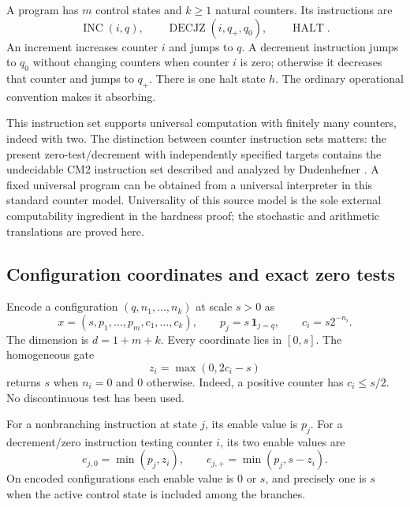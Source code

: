 \documentclass[11pt,letterpaper]{article}
\theoremstyle{definition}
\theoremstyle{remark}
\begin{document}
A program has $m$ control states and $k\geq1$ natural counters. Its
instructions are
\[
 \operatorname{INC}(i,q),\qquad
 \operatorname{DECJZ}(i,q_+,q_0),\qquad
 \operatorname{HALT}.
\]
An increment increases counter $i$ and jumps to $q$. A decrement instruction
jumps to $q_0$ without changing counters when counter $i$ is zero; otherwise
it decreases that counter and jumps to $q_+$. There is one halt state $h$.
The ordinary operational convention makes it absorbing.

This instruction set supports universal computation with finitely many
counters, indeed with two. The distinction between counter instruction
sets matters: the present zero-test/decrement with independently specified
targets contains the undecidable CM2 instruction set described and analyzed
by Dudenhefner \cite{dudenhefner}. A fixed universal program can be obtained
from a universal interpreter in this standard counter model. Universality
of this source model is the sole external computability ingredient in the
hardness proof; the stochastic and arithmetic translations are proved here.

\subsection{Configuration coordinates and exact zero tests}

Encode a configuration $(q,n_1,\ldots,n_k)$ at scale $s>0$ as
\begin{equation}
 x=(s,p_1,\ldots,p_m,c_1,\ldots,c_k),\qquad
 p_j=s\,\mathbf1_{j=q},\qquad c_i=s2^{-n_i}.
 \label{ste:ec:eq:counter-encoding}
\end{equation}
The dimension is $d=1+m+k$. Every coordinate lies in $[0,s]$. The
homogeneous gate
\begin{equation}
 z_i=\max(0,2c_i-s)
 \label{ste:ec:eq:zero-test}
\end{equation}
returns $s$ when $n_i=0$ and $0$ otherwise. Indeed, a positive counter has
$c_i\leq s/2$. No discontinuous test has been used.

For a nonbranching instruction at state $j$, its enable value is $p_j$.
For a decrement/zero instruction testing counter $i$, its two enable values
are
\begin{equation}
 e_{j,0}=\min(p_j,z_i),\qquad
 e_{j,+}=\min(p_j,s-z_i).
 \label{ste:ec:eq:enable}
\end{equation}
On encoded configurations each enable value is $0$ or $s$, and precisely
one is $s$ when the active control state is included among the branches.
\end{document}
